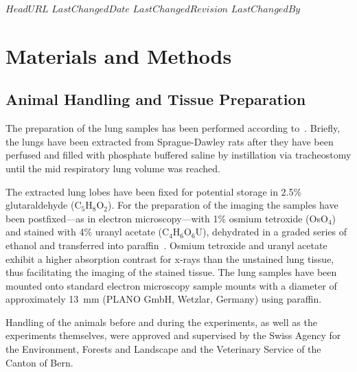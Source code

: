 \svnidlong
{$HeadURL$}
{$LastChangedDate$}
{$LastChangedRevision$}
{$LastChangedBy$}

\begin{center}
\end{center}

\section{Materials and Methods}
\label{sec:materials and methods}
\subsection{Animal Handling and Tissue Preparation}
The preparation of the lung samples has been performed according to~\citet{Schittny1997,Schittny1998}. Briefly, the lungs have been extracted from Sprague-Dawley rats after they have been perfused and filled with phosphate buffered saline by instillation via tracheostomy until the mid respiratory lung volume was reached.

The extracted lung lobes have been fixed for potential storage in 2.5\% glutaraldehyde (C$_5$H$_8$O$_2$). For the preparation of the imaging the samples have been postfixed---as in electron microscopy---with 1\% osmium tetroxide (OsO$_4$) and stained with 4\% uranyl acetate (C$_4$H$_6$O$_6$U), dehydrated in a graded series of ethanol and transferred into paraffin~\cite{Schittny1998,Schittny1997}. Osmium tetroxide and uranyl acetate exhibit a higher absorption contrast for x-rays than the unstained lung tissue, thus facilitating the imaging of the stained tissue. The lung samples have been mounted onto standard electron microscopy sample mounts with a diameter of approximately \SI{13}{\milli\meter} (PLANO GmbH, Wetzlar, Germany) using paraffin.

Handling of the animals before and during the experiments, as well as the experiments themselves, were approved and supervised by the Swiss Agency for the Environment, Forests and Landscape and the Veterinary Service of the Canton of Bern.

